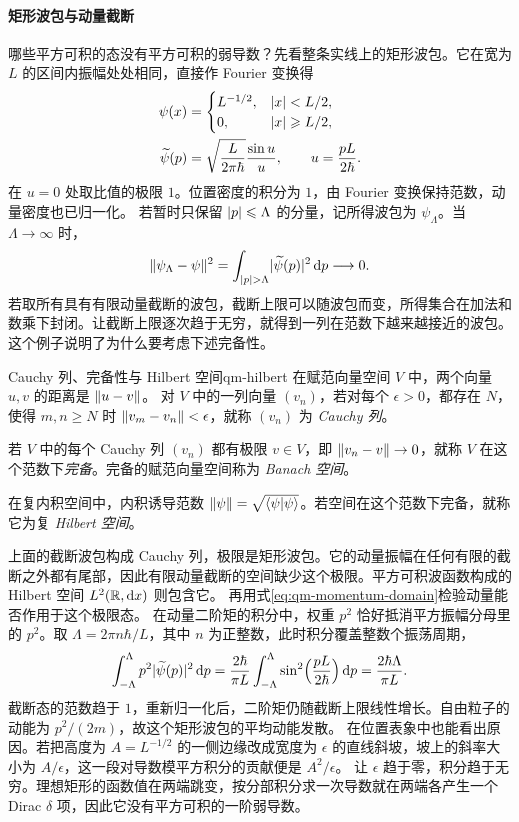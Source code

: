 \paragraph{矩形波包与动量截断}
哪些平方可积的态没有平方可积的弱导数？先看整条实线上的矩形波包。它在宽为 $L$ 的区间内振幅处处相同，直接作 Fourier 变换得
\begin{subequations}\label{eq:qm-rectangular-packet-fourier}
    \begin{align}
        \psi(x) &=
        \begin{cases}
            L^{-1/2},&\lvert x\rvert < L/2,\\
            0,&\lvert x\rvert \geqslant L/2,
        \end{cases}\\
        \widetilde\psi(p) &= \sqrt{\frac{L}{2\pi\hbar}}\frac{\sin u}{u},
            \qquad u = \frac{pL}{2\hbar}.
    \end{align}
\end{subequations}
在 $u = 0$ 处取比值的极限 $1$。位置密度的积分为 $1$，由 Fourier 变换保持范数，动量密度也已归一化。
若暂时只保留 $\lvert p\rvert \leqslant \Lambda$ 的分量，记所得波包为 $\psi_\Lambda$。当 $\Lambda \to \infty$ 时，
\[
    \lVert\psi_\Lambda - \psi\rVert^2
        = \int_{\lvert p\rvert>\Lambda}\lvert\widetilde\psi(p)\rvert^2\mathop{}\!\mathrm{d} p
        \longrightarrow 0 .
\]
若取所有具有有限动量截断的波包，截断上限可以随波包而变，所得集合在加法和数乘下封闭。让截断上限逐次趋于无穷，就得到一列在范数下越来越接近的波包。这个例子说明了为什么要考虑下述完备性。
\begin{definition}{Cauchy 列、完备性与 Hilbert 空间}{qm-hilbert}
    在赋范向量空间 $V$ 中，两个向量 $u,v$ 的距离是 $\lVert u - v\rVert$。
    对 $V$ 中的一列向量 $(v_n)$，若对每个 $\epsilon > 0$，都存在 $N$，使得 $m,n \ge N$ 时 $\lVert v_m - v_n\rVert < \epsilon$，就称 $(v_n)$ 为 \emph{Cauchy 列}。

    若 $V$ 中的每个 Cauchy 列 $(v_n)$ 都有极限 $v \in V$，即 $\lVert v_n - v\rVert \to 0$，就称 $V$ 在这个范数下\emph{完备}。完备的赋范向量空间称为 \emph{Banach 空间}。

    在复内积空间中，内积诱导范数 $\lVert\psi\rVert = \sqrt{\langle\psi\vert\psi\rangle}$。若空间在这个范数下完备，就称它为复 \emph{Hilbert 空间}。
\end{definition}
上面的截断波包构成 Cauchy 列，极限是矩形波包。它的动量振幅在任何有限的截断之外都有尾部，因此有限动量截断的空间缺少这个极限。平方可积波函数构成的 Hilbert 空间 $L^2(\mathbb{R},\mathop{}\!\mathrm{d} x)$ 则包含它。
再用式\eqref{eq:qm-momentum-domain}检验动量能否作用于这个极限态。
在动量二阶矩的积分中，权重 $p^2$ 恰好抵消平方振幅分母里的 $p^2$。取 $\Lambda = 2\pi n\hbar/L$，其中 $n$ 为正整数，此时积分覆盖整数个振荡周期，
\[
    \int_{-\Lambda}^{\Lambda}p^2\lvert\widetilde\psi(p)\rvert^2\mathop{}\!\mathrm{d} p
       = \frac{2\hbar}{\pi L}\int_{-\Lambda}^{\Lambda}
           \sin^2\Bigl(\frac{pL}{2\hbar}\Bigr)\mathop{}\!\mathrm{d} p
       = \frac{2\hbar\Lambda}{\pi L}.
\]
截断态的范数趋于 $1$，重新归一化后，二阶矩仍随截断上限线性增长。自由粒子的动能为 $p^2/(2m)$，故这个矩形波包的平均动能发散。
在位置表象中也能看出原因。若把高度为 $A = L^{-1/2}$ 的一侧边缘改成宽度为 $\epsilon$ 的直线斜坡，坡上的斜率大小为 $A/\epsilon$，这一段对导数模平方积分的贡献便是 $A^2/\epsilon$。
让 $\epsilon$ 趋于零，积分趋于无穷。理想矩形的函数值在两端跳变，按分部积分求一次导数就在两端各产生一个 Dirac $\delta$ 项，因此它没有平方可积的一阶弱导数。

